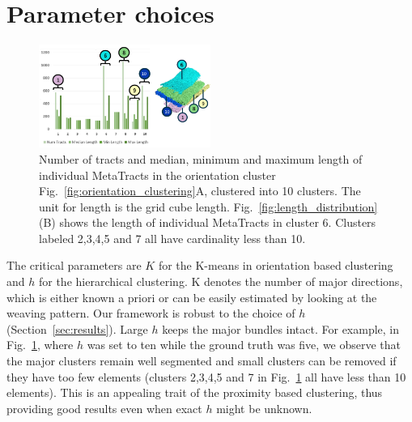 \section{Parameter choices}
\label{sec:param_choices}
\begin{figure}[tb]
\centering
	\includegraphics[width=0.5\textwidth,  trim = 0mm 260mm 0mm 15mm, clip]{images_pvis/figure9}
	\caption{Number of tracts and median, minimum and maximum length of individual MetaTracts in the orientation cluster Fig.~\ref{fig:orientation_clustering}A, clustered into 10 clusters. The unit for length is the grid cube length. Fig.~\ref{fig:length_distribution}(B) shows the length of individual MetaTracts in cluster 6. Clusters labeled 2,3,4,5 and 7 all have cardinality less than 10. }
	\label{fig:len_dist_crop16}
\end{figure}
The critical parameters are $K$ for the K-means in orientation based clustering and $h$ for the hierarchical clustering. K denotes the number of major directions, which is either known a priori or can be easily estimated by looking at the weaving pattern. 
Our framework is robust to the choice of $h$ (Section~\ref{sec:results}). Large $h$ keeps the major bundles intact. For example, in  Fig.~\ref{fig:len_dist_crop16}, where $h$ was set to ten while the ground truth was five, we observe that the major clusters remain well segmented and small clusters can be removed if they have too few elements (clusters 2,3,4,5 and 7 in Fig.~\ref{fig:len_dist_crop16} all have less than 10 elements). This is an appealing trait of the proximity based clustering, thus providing good results even when exact $h$ might be unknown.
